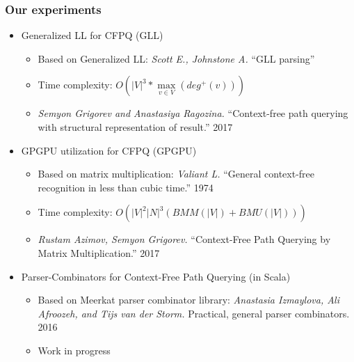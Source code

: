 \documentclass[xcolor=table,aspectratio=169]{beamer}
\begin{document}
\begin{frame}[fragile]
  \transwipe[direction=90]
  \frametitle{Our experiments}

\begin{itemize} 
\item Generalized LL for CFPQ (GLL)
\begin{itemize} 
  \item Based on Generalized LL: \emph{Scott E., Johnstone A.} ``GLL parsing''
  \item Time complexity: $O\left(|V|^3*\max\limits_{v \in V}\left(deg^+\left(v\right)\right)\right)$
  \item \emph{Semyon Grigorev and Anastasiya Ragozina.} ``Context-free path querying with structural 
  representation of result.'' 2017
\end{itemize}
\item GPGPU utilization for CFPQ (GPGPU)
\begin{itemize} 
   \item Based on matrix  multiplication: \emph{Valiant L.} ``General context-free recognition in less than cubic time.'' 1974
   \item Time complexity: $O(|V|^2 |N|^3(BMM(|V|) + BMU(|V|)))$
   \item \emph{Rustam Azimov, Semyon Grigorev.} ``Context-Free Path Querying by Matrix 
     Multiplication.'' 2017
\end{itemize}
\item Parser-Combinators for Context-Free Path Querying (in Scala)
\begin{itemize} 
  \item Based on Meerkat parser combinator library: \emph{Anastasia Izmaylova, Ali Afroozeh, and Tijs van der Storm.} 
  Practical, general parser combinators. 2016
  \item Work in progress
\end{itemize}

\end{itemize}
\end{frame}
\end{document}
